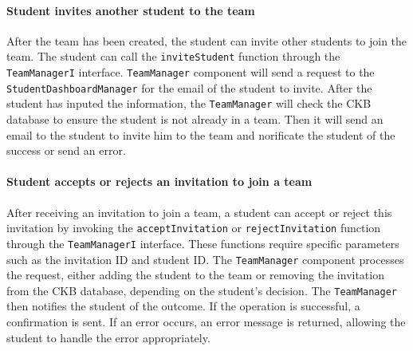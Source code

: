 \paragraph{Student invites another student to the team}
After the team has been created, the student can invite other students to join the team. 
The student can call the \verb|inviteStudent| function through the \verb|TeamManagerI| interface.
\verb|TeamManager| component will send a request to the \verb|StudentDashboardManager| for the email of the student to invite. 
After the student has inputed the information, the \verb|TeamManager| will check the CKB database to ensure the student is not already in a team.
Then it will send an email to the student to invite him to the team and norificate the student of the success or send an error.

\paragraph{Student accepts or rejects an invitation to join a team}
After receiving an invitation to join a team, a student can accept or reject this invitation by invoking the \verb|acceptInvitation| or \verb|rejectInvitation| function through the \verb|TeamManagerI| interface. 
These functions require specific parameters such as the invitation ID and student ID. The \verb|TeamManager| component processes the request, either adding the student to the team or removing the invitation from the CKB database, depending on the student's decision. 
The \verb|TeamManager| then notifies the student of the outcome. If the operation is successful, a confirmation is sent. If an error occurs, an error message is returned, allowing the student to handle the error appropriately.

